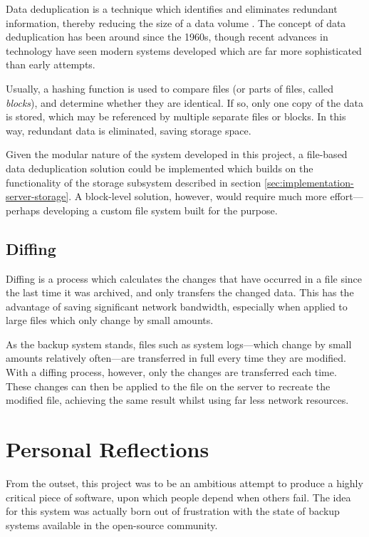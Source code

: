Data deduplication is a technique which identifies and eliminates redundant
information, thereby reducing the size of a data volume \cite{geer2008}. The
concept of data deduplication has been around since the 1960s, though recent
advances in technology have seen modern systems developed which are far more
sophisticated than early attempts.

Usually, a hashing function is used to compare files (or parts of files, called
\emph{blocks}), and determine whether they are identical. If so, only one copy
of the data is stored, which may be referenced by multiple separate files or
blocks. In this way, redundant data is eliminated, saving storage space.

Given the modular nature of the system developed in this project, a file-based
data deduplication solution could be implemented which builds on the
functionality of the storage subsystem described in section
\ref{sec:implementation-server-storage}. A block-level solution, however, would
require much more effort---perhaps developing a custom file system built for
the purpose.

\subsection{Diffing}

Diffing is a process which calculates the changes that have occurred in a file
since the last time it was archived, and only transfers the changed data. This
has the advantage of saving significant network bandwidth, especially when
applied to large files which only change by small amounts.

As the backup system stands, files such as system logs---which change by small
amounts relatively often---are transferred in full every time they are
modified. With a diffing process, however, only the changes are transferred
each time. These changes can then be applied to the file on the server to
recreate the modified file, achieving the same result whilst using far less
network resources.

\section{Personal Reflections}

From the outset, this project was to be an ambitious attempt to produce
a highly critical piece of software, upon which people depend when others fail.
The idea for this system was actually born out of frustration with the state of
backup systems available in the open-source community.

